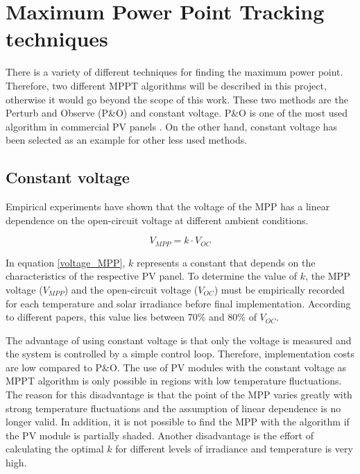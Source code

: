 \section{Maximum Power Point Tracking techniques\label{MPPTalgo}}

There is a variety of different techniques for finding the maximum power point. Therefore, two different MPPT algorithms will be described in this project, otherwise it would go beyond the scope of this work. These two methods are the Perturb and Observe (P\&O) and constant voltage. P\&O is one of the most used algorithm in commercial PV panels \cite{Dezso}. On the other hand, constant voltage has been selected as an example for other less used methods. 

\subsection{Constant voltage}
Empirical experiments have shown that the voltage of the MPP has a linear dependence on the open-circuit voltage at different ambient conditions\cite{flowchartVC}.

\begin{equation} \label{voltage_MPP}
V_{MPP} = k \cdot V_{OC}	
\end{equation} 

In equation \ref{voltage_MPP}, $k$ represents a constant that depends on the characteristics of the respective PV panel. To determine the value of $k$, the MPP voltage ($V_{MPP}$) and the open-circuit voltage ($V_{OC}$) must be empirically recorded for each temperature and solar irradiance before final implementation. According to different papers, this value lies between 70\% and 80\% of $V_{OC}$. \cite{MPPTResearch}\cite{MPPTConstV}


The advantage of using constant voltage is that only the voltage is measured and the system is controlled by a simple control loop. Therefore, implementation costs are low compared to P\&O. The use of PV modules with the constant voltage as MPPT algorithm is only possible in regions with low temperature fluctuations. The reason for this disadvantage is that the point of the MPP varies greatly with strong temperature fluctuations and the assumption of linear dependence is no longer valid. In addition, it is not possible to find the MPP with the algorithm if the PV module is partially shaded. Another disadvantage is the effort of calculating the optimal $k$ for different levels of irradiance and temperature is very high.\cite{flowchartVC} \cite{MPPTConstV}


